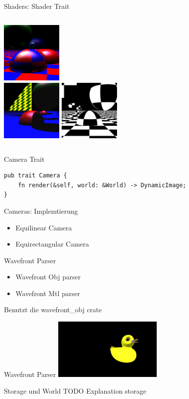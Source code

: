 \documentclass{beamer}
\begin{document}
\begin{frame}{Shaders: Shader Trait}
    \begin{columns}[t]
        \centering
        \includegraphics[height=3cm]{example-true-ambiant} \\
        \includegraphics[height=3cm]{example-mirror}
        \centering
        \includegraphics[height=3cm]{example-mirror2}
    \end{columns}
\end{frame}
\begin{frame}[fragile]{Camera Trait}
    \begin{lstlisting}
pub trait Camera {
    fn render(&self, world: &World) -> DynamicImage;
}
    \end{lstlisting}
\end{frame}
\begin{frame}{Cameras: Implemtierung}
    \begin{itemize}[<+->]
        \item Equilinear Camera
        \item Equirectangular Camera
    \end{itemize}
\end{frame}
\begin{frame}{Wavefront Parser}
    \begin{itemize}[<+->]
        \item Wavefront Obj parser
        \item Wavefront Mtl parser
    \end{itemize}
    Benutzt die wavefront\_obj crate
\end{frame}
\begin{frame}{Wavefront Parser}
    \includegraphics[height=3cm]{example-duck}
\end{frame}
\begin{frame}{Storage und World}
    TODO Explanation storage
\end{frame}
\end{document}
